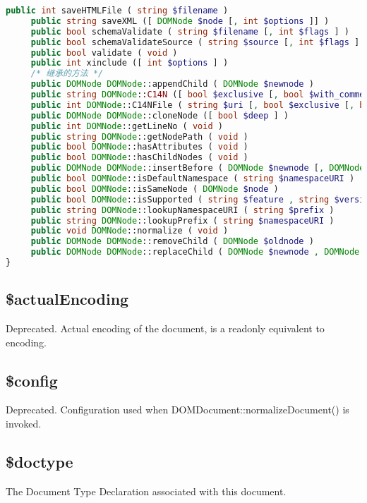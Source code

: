 \begin{lstlisting}[language=PHP]
     public int saveHTMLFile ( string $filename )
     public string saveXML ([ DOMNode $node [, int $options ]] )
     public bool schemaValidate ( string $filename [, int $flags ] )
     public bool schemaValidateSource ( string $source [, int $flags ] )
     public bool validate ( void )
     public int xinclude ([ int $options ] )
     /* 继承的方法 */
     public DOMNode DOMNode::appendChild ( DOMNode $newnode )
     public string DOMNode::C14N ([ bool $exclusive [, bool $with_comments [, array $xpath [, array $ns_prefixes ]]]] )
     public int DOMNode::C14NFile ( string $uri [, bool $exclusive [, bool $with_comments [, array $xpath [, array $ns_prefixes ]]]] )
     public DOMNode DOMNode::cloneNode ([ bool $deep ] )
     public int DOMNode::getLineNo ( void )
     public string DOMNode::getNodePath ( void )
     public bool DOMNode::hasAttributes ( void )
     public bool DOMNode::hasChildNodes ( void )
     public DOMNode DOMNode::insertBefore ( DOMNode $newnode [, DOMNode $refnode ] )
     public bool DOMNode::isDefaultNamespace ( string $namespaceURI )
     public bool DOMNode::isSameNode ( DOMNode $node )
     public bool DOMNode::isSupported ( string $feature , string $version )
     public string DOMNode::lookupNamespaceURI ( string $prefix )
     public string DOMNode::lookupPrefix ( string $namespaceURI )
     public void DOMNode::normalize ( void )
     public DOMNode DOMNode::removeChild ( DOMNode $oldnode )
     public DOMNode DOMNode::replaceChild ( DOMNode $newnode , DOMNode $oldnode )
}
\end{lstlisting}


\subsection{\$actualEncoding}

Deprecated. Actual encoding of the document, is a readonly equivalent to encoding.

\subsection{\$config}

Deprecated. Configuration used when DOMDocument::normalizeDocument() is invoked.

\subsection{\$doctype}

The Document Type Declaration associated with this document.

